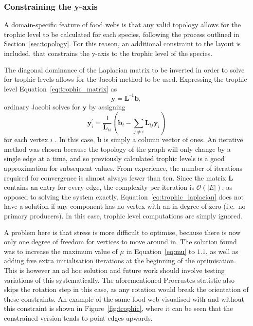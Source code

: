 \subsubsection{Constraining the y-axis}
A domain-specific feature of food webs is that any valid topology allows for the trophic level to be calculated for each species, following the process outlined in Section~\ref{sec:topology}. For this reason, an additional constraint to the layout is included, that constrains the y-axis to the trophic level of the species.

The diagonal dominance of the Laplacian matrix to be inverted in order to solve for trophic levels allows for the Jacobi method to be used. Expressing the trophic level Equation~\eqref{eq:trophic_matrix} as 
\begin{equation}
  \mathbf{y} = \mathbf{L}^{\text{--}1}\mathbf{b},
  \label{eq:trophic_laplacian}
\end{equation}
ordinary Jacobi solves for $\mathbf{y}$ by assigning
\begin{equation}
  \mathbf{y}_i^\prime = \frac{1}{\mathbf{L}_{ii}}\left(\mathbf{b}_i - \sum_{j\neq i}\mathbf{L}_{ij}\mathbf{y}_i\right)
\end{equation}
for each vertex $i$ \citep{Young2014}. In this case, $\mathbf{b}$ is simply a column vector of ones.
An iterative method was chosen because the topology of the graph will only change by a single edge at a time, and so previously calculated trophic levels is a good approximation for subsequent values. From experience, the number of iterations required for convergence is almost always fewer than ten. Since the matrix $\mathbf{L}$ contains an entry for every edge, the complexity per iteration is $\mathcal{O}(|E|)$, as opposed to solving the system exactly. 
Equation~\eqref{eq:trophic_laplacian} does not have a solution if any component has no vertex with an in-degree of zero (i.e.\ no primary producers). In this case, trophic level computations are simply ignored.

A problem here is that stress is more difficult to optimise, because there is now only one degree of freedom for vertices to move around in. The solution found was to increase the maximum value of $\mu$ in Equation~\eqref{eq:mu} to $1.1$, as well as adding five extra initialisation iterations at the beginning of the optimisation. This is however an ad hoc solution and future work should involve testing variations of this systematically.
The aforementioned Procrustes statistic also skips the rotation step in this case, as any rotation would break the orientation of these constraints.
An example of the same food web visualised with and without this constraint is shown in Figure~\ref{fig:trophic}, where it can be seen that the constrained version tends to point edges upwards.

